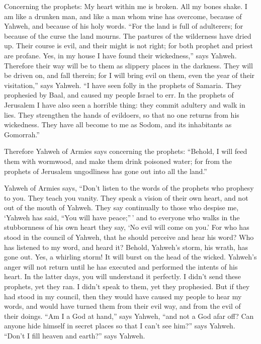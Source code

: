  Concerning the prophets: My heart within me is broken.
All my bones shake. I am like a drunken man, and like a man whom wine
has overcome, because of Yahweh, and because of his holy words.
 ``For the land is full of adulterers; for because of the
curse the land mourns. The pastures of the wilderness have dried up.
Their course is evil, and their might is not right;  for
both prophet and priest are profane. Yes, in my house I have found their
wickedness,'' says Yahweh.  Therefore their way will be
to them as slippery places in the darkness. They will be driven on, and
fall therein; for I will bring evil on them, even the year of their
visitation,'' says Yahweh.  ``I have seen folly in the
prophets of Samaria. They prophesied by Baal, and caused my people
Israel to err.  In the prophets of Jerusalem I have also
seen a horrible thing: they commit adultery and walk in lies. They
strengthen the hands of evildoers, so that no one returns from his
wickedness. They have all become to me as Sodom, and its inhabitants as
Gomorrah.''

 Therefore Yahweh of Armies says concerning the prophets:
``Behold, I will feed them with wormwood, and make them drink poisoned
water; for from the prophets of Jerusalem ungodliness has gone out into
all the land.''

 Yahweh of Armies says, ``Don't listen to the words of
the prophets who prophesy to you. They teach you vanity. They speak a
vision of their own heart, and not out of the mouth of Yahweh.
 They say continually to those who despise me, `Yahweh
has said, ``You will have peace;''\,' and to everyone who walks in the
stubbornness of his own heart they say, `No evil will come on you.'
 For who has stood in the council of Yahweh, that he
should perceive and hear his word? Who has listened to my word, and
heard it?  Behold, Yahweh's storm, his wrath, has gone
out. Yes, a whirling storm! It will burst on the head of the wicked.
 Yahweh's anger will not return until he has executed and
performed the intents of his heart. In the latter days, you will
understand it perfectly.  I didn't send these prophets,
yet they ran. I didn't speak to them, yet they prophesied.
 But if they had stood in my council, then they would
have caused my people to hear my words, and would have turned them from
their evil way, and from the evil of their doings.  ``Am
I a God at hand,'' says Yahweh, ``and not a God afar off?
 Can anyone hide himself in secret places so that I can't
see him?'' says Yahweh. ``Don't I fill heaven and earth?'' says Yahweh.

